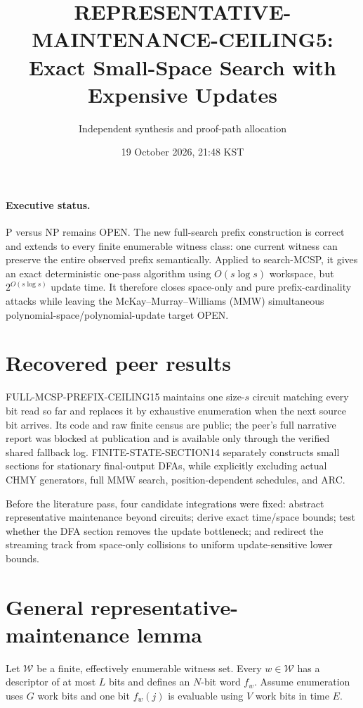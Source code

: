 \documentclass[11pt]{article}
\title{REPRESENTATIVE-MAINTENANCE-CEILING5:\\Exact Small-Space Search with Expensive Updates}
\author{Independent synthesis and proof-path allocation}
\date{19 October 2026, 21:48 KST}
\begin{document}
\maketitle

\paragraph{Executive status.}
P versus NP remains OPEN.  The new full-search prefix construction is correct
and extends to every finite enumerable witness class: one current witness can
preserve the entire observed prefix semantically.  Applied to search-MCSP, it
gives an exact deterministic one-pass algorithm using $O(s\log s)$ workspace,
but $2^{O(s\log s)}$ update time.  It therefore closes space-only and pure
prefix-cardinality attacks while leaving the McKay--Murray--Williams (MMW)
simultaneous polynomial-space/polynomial-update target OPEN.

\section{Recovered peer results}
FULL-MCSP-PREFIX-CEILING15 maintains one size-$s$ circuit matching every bit
read so far and replaces it by exhaustive enumeration when the next source bit
arrives.  Its code and raw finite census are public; the peer's full narrative
report was blocked at publication and is available only through the verified
shared fallback log.  FINITE-STATE-SECTION14 separately constructs small
sections for stationary final-output DFAs, while explicitly excluding actual
CHMY generators, full MMW search, position-dependent schedules, and ARC.

Before the literature pass, four candidate integrations were fixed: abstract
representative maintenance beyond circuits; derive exact time/space bounds;
test whether the DFA section removes the update bottleneck; and redirect the
streaming track from space-only collisions to uniform update-sensitive lower
bounds.

\section{General representative-maintenance lemma}
Let $\mathcal W$ be a finite, effectively enumerable witness set.  Every
$w\in\mathcal W$ has a descriptor of at most $L$ bits and defines an $N$-bit
word $f_w$.  Assume enumeration uses $G$ work bits and one bit $f_w(j)$ is
evaluable using $V$ work bits in time $E$.
\end{document}
